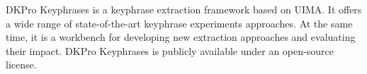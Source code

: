 DKPro Keyphrases is a keyphrase extraction framework based on UIMA. It offers a wide range of state-of-the-art keyphrase experiments approaches. At the same time, it is a workbench for developing new extraction approaches and evaluating their impact. DKPro Keyphrases is publicly available under an open-source license.
